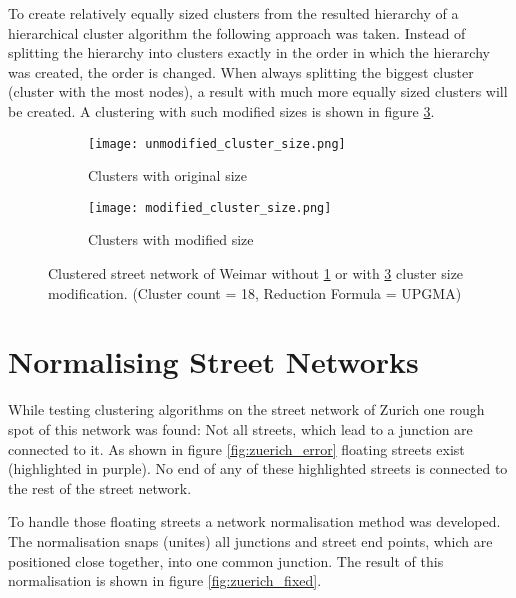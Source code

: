 To create relatively equally sized clusters from the resulted hierarchy of a hierarchical cluster algorithm the following approach was taken. Instead of splitting the hierarchy into clusters exactly in the order in which the hierarchy was created, the order is changed. When always splitting the biggest cluster (cluster with the most nodes), a result with much more equally sized clusters will be created. A clustering with such modified sizes is shown in figure \ref{fig:modified_cluster_size}.

\begin{figure}
    \centering
    \begin{subfigure}[b]{0.49\textwidth}
        \begin{mdframed}[style=mdthight, userdefinedwidth=0.9\linewidth]
            \texttt{[image: unmodified\_cluster\_size.png]}
        \end{mdframed}
        \caption{Clusters with original size}
        \label{fig:unmodified_cluster_size}
    \end{subfigure}
    \begin{subfigure}[b]{0.49\textwidth}
        \begin{mdframed}[style=mdthight, userdefinedwidth=0.9\linewidth]
            \texttt{[image: modified\_cluster\_size.png]}
        \end{mdframed}
        \caption{Clusters with modified size}
        \label{fig:modified_cluster_size}
    \end{subfigure}
    \caption{Clustered street network of Weimar without \ref{fig:unmodified_cluster_size} or with \ref{fig:modified_cluster_size} cluster size modification. (Cluster count = 18, Reduction Formula = \acrshort{UPGMA})}
\end{figure}

\pagebreak
\section{Normalising Street Networks}
While testing clustering algorithms on the street network of Zurich one rough spot of this network was found: Not all streets, which lead to a junction are connected to it. As shown in figure \ref{fig:zuerich_error} floating streets exist (highlighted in purple). No end of any of these highlighted streets is connected to the rest of the street network.

To handle those floating streets a network normalisation method was developed. The normalisation snaps (unites) all junctions and street end points, which are positioned close together, into one common junction. The result of this normalisation is shown in figure \ref{fig:zuerich_fixed}.

